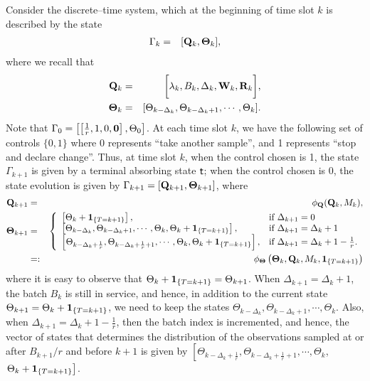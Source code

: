\documentclass[acmtosn]{acmtrans2m}
\newcommand{\nn}{\nonumber \\}
{\theorembodyfont{\rmfamily}
\newtheorem{remarks}{Remark}[section]} \newtheorem{theorem}{Theorem}
\begin{document}
Consider the discrete--time
system, which at the beginning of time slot $k$ is described by the
state  
\begin{eqnarray*} 
\Gamma_k & = & [{\bf Q}_k, {\bf \Theta}_k],
\end{eqnarray*} 
where we recall that
\begin{eqnarray*} 
{\bf Q}_{k} & = & \bigg[\lambda_k, B_k, \Delta_k, {\bf W}_k, {\bf R}_k\bigg],\\
{\bf\Theta}_k & = & [\Theta_{k-\Delta_k}, \Theta_{k-\Delta_k+1},
\cdots, \Theta_k].
\end{eqnarray*}
Note that $\Gamma_0 = \left[\left[\frac{1}{r}, 1, 0, {\bf 0}\right], 
\Theta_0\right]$.
At each time slot $k$, we have the following set of controls $\{0,1\}$
where 0 represents ``{\sf take another sample}'', and 1 represents
``{\sf stop and declare change}''.  Thus, at time slot $k$, when the
control chosen is 1, the state $\Gamma_{k+1}$ is given by a terminal
absorbing state ${\sf t}$;  when the control chosen is 0, the state
evolution is given by $\Gamma_{k+1}  =  [{\bf Q}_{k+1}, 
{\bf \Theta}_{k+1}]$, where 
\begin{eqnarray}
\label{eqn:gamma_evolution}
{\bf Q}_{k+1}          & = & {\bf \phi}_{{\bf Q}}({\bf Q}_k,M_k),\nn
{\bf\Theta}_{k+1}            
  & = & \left\{
	  \begin{array}{ll}
	  \left[\Theta_k + {\bf 1}_{\{T = k+1\}}\right], & \text{if} \ \Delta_{k+1}=0 \\
	   \left[\Theta_{k-\Delta_k}, \Theta_{k-\Delta_k+1},
\cdots, \Theta_k, \Theta_k + {\bf 1}_{\{T = k+1\}}\right], & \text{if} \
	  \Delta_{k+1}=\Delta_k+1 \\
	   \left[\Theta_{k-\Delta_k+\frac{1}{r}},
	   \Theta_{k-\Delta_k+\frac{1}{r}+1},
\cdots, \Theta_k, \Theta_k + {\bf 1}_{\{T = k+1\}}\right], & \text{if} \
	  \Delta_{k+1}=\Delta_k+1-\frac{1}{r}. 
	  \end{array}
	  \right.\nonumber\\
	  & =: & {\bf \phi}_{\bf \Theta}\left({\bf \Theta}_k,{\bf Q}_k,M_k,{\bf
	  1}_{\{T = k+1\}}\right)
\end{eqnarray}
where it is easy to observe that $\Theta_k + {\bf 1}_{\{T
= k+1\}} = \Theta_{k+1}$. When $\Delta_{k+1} = \Delta_k+1$, the 
batch $B_k$ is still in service, and hence, 
in addition to the current state $\Theta_{k+1} = 
\Theta_k + {\bf 1}_{\{T = k+1\}}$, 
we need to keep the states   
$\Theta_{k-\Delta_k}, \Theta_{k-\Delta_k+1},
\cdots, \Theta_k$. Also, when $\Delta_{k+1} =
\Delta_k+1-\frac{1}{r}$, then the batch index is incremented, and hence, 
the vector of states that determines the distribution of the observations 
sampled at or after $B_{k+1}/r$ and before $k+1$ is given by
$\left[\Theta_{k-\Delta_k+\frac{1}{r}}, \Theta_{k-\Delta_k+\frac{1}{r}+1},
\cdots, \Theta_k\right.$, $\left.\Theta_k + {\bf 1}_{\{T = k+1\}}\right]$. 
\end{document}
